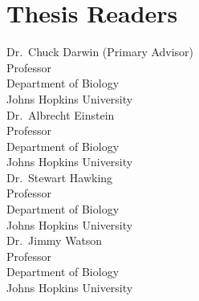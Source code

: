%

%
\section*{Thesis Readers}
\begin{singlespace}
%
\noindent Dr.~Chuck Darwin (Primary Advisor)\\
\indent \indent Professor\\
\indent \indent Department of Biology\\
\indent \indent Johns Hopkins University\\

\noindent Dr.~Albrecht Einstein\\
\indent \indent Professor\\
\indent \indent Department of Biology\\
\indent \indent Johns Hopkins University\\

\noindent Dr.~Stewart Hawking\\
\indent \indent Professor\\
\indent \indent Department of Biology\\
\indent \indent Johns Hopkins University\\

\noindent Dr.~Jimmy Watson\\
\indent \indent Professor\\
\indent \indent Department of Biology\\
\indent \indent Johns Hopkins University\\
%
%
\end{singlespace}
